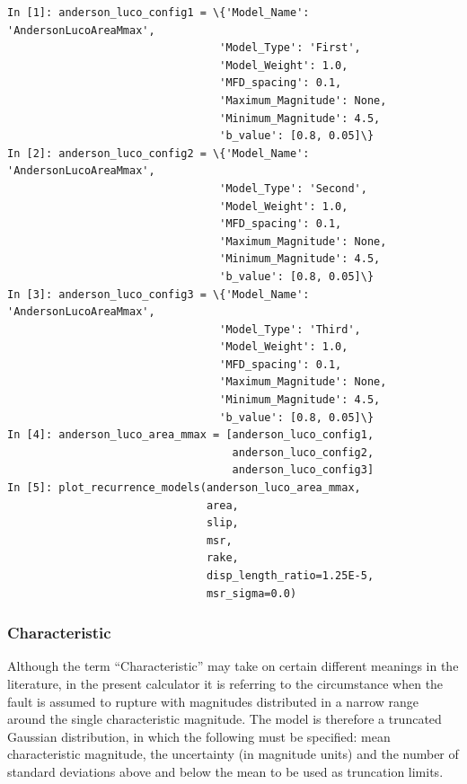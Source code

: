 \begin{Verbatim}[frame=single, commandchars=\\\{\}, fontsize=\scriptsize]
In [1]: anderson_luco_config1 = \{'Model_Name': 'AndersonLucoAreaMmax',
                                 'Model_Type': 'First',
                                 'Model_Weight': 1.0,  
                                 'MFD_spacing': 0.1,
                                 'Maximum_Magnitude': None,
                                 'Minimum_Magnitude': 4.5,
                                 'b_value': [0.8, 0.05]\}
In [2]: anderson_luco_config2 = \{'Model_Name': 'AndersonLucoAreaMmax',
                                 'Model_Type': 'Second',
                                 'Model_Weight': 1.0,
                                 'MFD_spacing': 0.1,
                                 'Maximum_Magnitude': None,
                                 'Minimum_Magnitude': 4.5,
                                 'b_value': [0.8, 0.05]\}
In [3]: anderson_luco_config3 = \{'Model_Name': 'AndersonLucoAreaMmax',
                                 'Model_Type': 'Third',
                                 'Model_Weight': 1.0,   
                                 'MFD_spacing': 0.1,
                                 'Maximum_Magnitude': None,
                                 'Minimum_Magnitude': 4.5,
                                 'b_value': [0.8, 0.05]\}
In [4]: anderson_luco_area_mmax = [anderson_luco_config1,
                                   anderson_luco_config2,
                                   anderson_luco_config3]
In [5]: plot_recurrence_models(anderson_luco_area_mmax,
                               area,
                               slip,
                               msr,
                               rake,
                               disp_length_ratio=1.25E-5, 
                               msr_sigma=0.0)

\end{Verbatim}

\subsubsection{Characteristic}

Although the term ``Characteristic'' may take on certain different meanings in the literature, in the present calculator it is referring to the circumstance when the fault is assumed to rupture with magnitudes distributed in a narrow range around the single characteristic magnitude. The model is therefore a truncated Gaussian distribution, in which the following must be specified: mean characteristic magnitude, the uncertainty (in magnitude units) and the number of standard deviations above and below the mean to be used as truncation limits.

